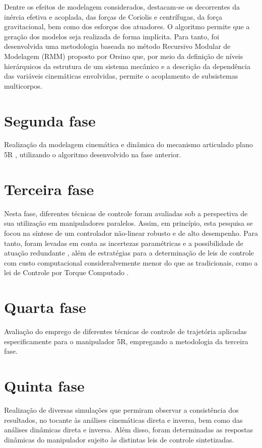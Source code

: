 \documentclass[]{politex}
\begin{document}
Dentre os efeitos de modelagem considerados, destacam-se os decorrentes da inércia efetiva e acoplada, das forças de Coriolis e centrífugas, da força gravitacional, bem como dos esforços dos atuadores. O algoritmo permite que a geração dos modelos seja realizada de forma implícita. Para tanto, foi desenvolvida uma metodologia baseada no método Recursivo Modular de Modelagem (RMM) proposto por Orsino \cite{23orsino} que, por meio da definição de níveis hierárquicos da estrutura de um sistema mecânico e a descrição da dependência das variáveis cinemáticas envolvidas,  permite o acoplamento de subsistemas multicorpos.

\section{Segunda fase} 
Realização da modelagem cinemática e dinâmica do mecanismo articulado plano 5R \cite{22orsino}, utilizando o algoritmo desenvolvido na fase anterior.

\section{Terceira fase} 
Nesta fase, diferentes técnicas de controle foram avaliadas sob a perspectiva de sua utilização em manipuladores paralelos. Assim, em princípio, esta pesquisa se focou na síntese de um controlador não-linear robusto e de alto desempenho. Para tanto, foram levadas em conta as incertezas paramétricas e a possibilidade de atuação redundante \cite{Cheng}, além de estratégias para a determinação de leis de controle com custo computacional consideralvemente menor do que as tradicionais, como a lei de Controle por Torque Computado \cite{Craig, Zubizarreta}.

\section{Quarta fase} Avaliação do emprego de diferentes técnicas de controle de trajetória aplicadas especificamente para o manipulador 5R, empregando a metodologia da terceira fase.

\section{Quinta fase} Realização de diversas simulações que permiram observar a consistência dos resultados, no tocante às análises cinemáticas direta e inversa, bem como das análises dinâmicas direta e inversa. Além disso, foram determinadas as respostas dinâmicas do manipulador sujeito às distintas leis de controle sintetizadas.
\end{document}
